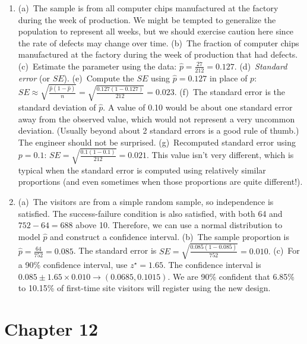 \documentclass[
  10pt,
  openany]{book}
\begin{document}
\begin{enumerate}
  \addtocounter{enumi}{1}
\item
  (a)~The sample is from all computer chips manufactured at the factory during the week of production. We might be tempted to generalize the population to represent all weeks, but we should exercise caution here since the rate of defects may change over time. (b)~The fraction of computer chips manufactured at the factory during the week of production that had defects. (c)~Estimate the parameter using the data: \(\hat{p} = \frac{27}{212} = 0.127\). (d)~\emph{Standard error} (or \(SE\)). (e)~Compute the \(SE\) using \(\hat{p} = 0.127\) in place of \(p\): \(SE \approx \sqrt{\frac{\hat{p}(1 - \hat{p})}{n}} = \sqrt{\frac{0.127(1 - 0.127)}{212}} = 0.023\). (f)~The standard error is the standard deviation of \(\hat{p}\). A value of 0.10 would be about one standard error away from the observed value, which would not represent a very uncommon deviation. (Usually beyond about 2 standard errors is a good rule of thumb.) The engineer should not be surprised. (g)~Recomputed standard error using \(p = 0.1\): \(SE = \sqrt{\frac{0.1(1 - 0.1)}{212}} = 0.021\). This value isn't very different, which is typical when the standard error is computed using relatively similar proportions (and even sometimes when those proportions are quite different!).

  \addtocounter{enumi}{1}
\item
  (a)~The visitors are from a simple random sample, so independence is satisfied. The success-failure condition is also satisfied, with both 64 and \(752 - 64 = 688\) above 10. Therefore, we can use a normal distribution to model \(\hat{p}\) and construct a confidence interval. (b)~The sample proportion is \(\hat{p} = \frac{64}{752} = 0.085\). The standard error is \(SE = \sqrt{\frac{0.085 (1 - 0.085)}{752}} = 0.010.\) (c)~For a 90\% confidence interval, use \(z^{\star} = 1.65\). The confidence interval is \(0.085 \pm 1.65 \times 0.010 \to (0.0685, 0.1015)\). We are 90\% confident that 6.85\% to 10.15\% of first-time site visitors will register using the new design.

  \addtocounter{enumi}{1}
\end{enumerate}

\hypertarget{exercise-solutions-17}{%
\section{Chapter 12}\label{exercise-solutions-17}}
\end{document}
